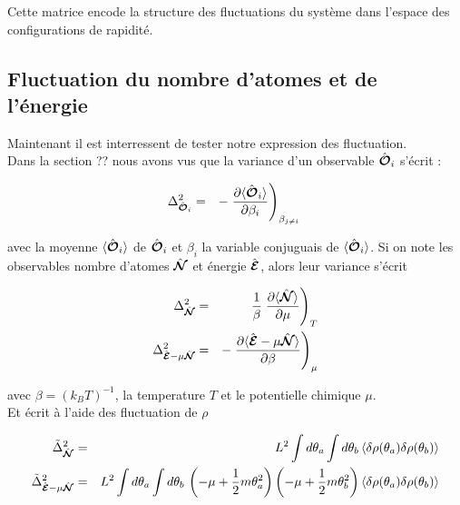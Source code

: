 Cette matrice encode la structure des fluctuations du système dans l’espace des configurations de rapidité.



\subsection{Fluctuation du nombre d'atomes et de l'énergie}

Maintenant il est interressent de tester notre expression des fluctuation.\\
Dans la section {??} nous avons vus que la variance d'un observable $\hat{\bm{\mathcal{O}}}_i$ s'écrit :

\begin{eqnarray*}
	\Delta_{\operator{\mathcal{O}}_i}^2 & = & -  \left . \frac{ \partial \langle \operator{\mathcal{O}}_i \rangle }{ \partial \beta_i } 	 \right )_{\beta_{j \neq i } }
\end{eqnarray*}

avec la moyenne $\langle \hat{\bm{\mathcal{O}}}_i \rangle $ de  $\hat{\bm{\mathcal{O}}}_i$ et $\beta_i$ la variable conjuguais de $\langle \hat{\bm{\mathcal{O}}}_i \rangle $. Si on note les observables nombre d'atomes $\hat{\bm{\mathcal{N}}}$ et énergie $\hat{\bm{\mathcal{E}}}$, alors leur variance s'écrit 
 

\begin{eqnarray*}
	\Delta_{\hat{\bm{\mathcal{N}}}}^2  & = &  \frac{1}{\beta} \left . \frac{\partial \langle \hat{\bm{\mathcal{N}}} \rangle}{\partial \mu} \right )_T \\
	\Delta_{\hat{\bm{\mathcal{E}}}-\mu \hat{\bm{\mathcal{N}}}}^2  & = &  - \left . \frac{\partial \langle \hat{\bm{\mathcal{E}}}-\mu \hat{\bm{\mathcal{N}}} \rangle}{\partial \beta} \right )_\mu 
\end{eqnarray*}

avec $\beta = (k_B T)^{-1}$, la temperature $T$ et  le potentielle chimique $\mu$.\\

Et écrit à l'aide des fluctuation de $\rho$

\begin{eqnarray*}
	\tilde{\Delta}_{\hat{\bm{\mathcal{N}}}}^2  &= & L^2 \int d\theta_a \int d \theta_b \, \langle \delta \rho(\theta_a) \delta \rho(\theta_b) \rangle \\
	\tilde{\Delta}_{\hat{\bm{\mathcal{E}}}-\mu \hat{\bm{\mathcal{N}}}}^2  & = & L^2 \int d\theta_a \int d \theta_b \, \left ( - \mu + \frac{1}2 m \theta_a^2  \right  )\left ( - \mu + \frac{1}2 m \theta_b^2  \right  )  \langle \delta \rho(\theta_a) \delta \rho(\theta_b) \rangle
\end{eqnarray*}

